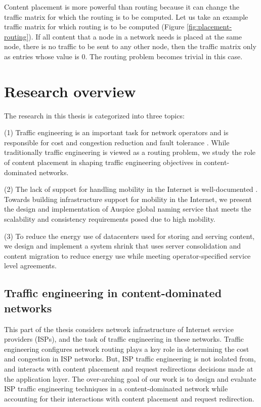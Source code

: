 Content placement is more powerful than routing because it can change the traffic matrix for which the routing is to be computed. Let us take an example traffic matrix for which routing is to be computed (Figure \ref{fig:placement-routing}). If all content that a node in a network needs is placed at the same node, there is no traffic to be sent to any other node, then the traffic matrix only as entries whose value is 0. The routing problem becomes trivial in this case. 






\section{Research overview}

The research in this thesis is categorized into three topics: 

(1) Traffic engineering is an important task for network operators and is responsible for cost and congestion reduction and fault tolerance \cite{rexford,COPE,TEXCP}. While traditionally traffic engineering is viewed as a routing problem, we study the role of content placement in shaping traffic engineering objectives in content-dominated networks.

(2) The lack of support for handling mobility in the Internet is well-documented \cite{HIP,LISP,HAIR,MobilityFirst}. Towards building infrastructure support for mobility in the Internet, we present the design and implementation of Auspice global naming service that meets the scalability and consistency requirements posed due to high mobility.

(3) To reduce the energy use of datacenters used for storing and serving content, we design and implement a system shrink that uses server consolidation and content migration to reduce energy use while meeting operator-specified service level agreements.


\subsection{Traffic engineering in content-dominated networks}

This part of the thesis considers network infrastructure of Internet service providers (ISPs), and the task of traffic engineering in these networks. Traffic engineering configures network routing plays a key role in determining the cost and congestion in ISP networks. But, ISP traffic engineering is not isolated from, and interacts with content placement and request redirections decisions made at the application layer. The over-arching goal of our work is to design and evaluate ISP traffic engineering techniques in a content-dominated network while accounting for their interactions with content placement and request redirection. 

